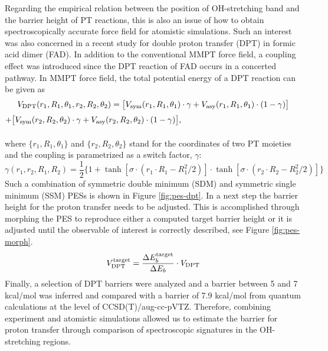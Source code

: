 \documentclass[journal=jacsat,manuscript=article]{achemso}
\begin{document}
\noindent
Regarding the empirical relation between the position of OH-stretching
band and the barrier height of PT reactions, this is also an issue of
how to obtain spectroscopically accurate force field for atomistic
simulations. Such an interest was also concerned in a recent study for
double proton transfer (DPT) in formic acid dimer
(FAD)\cite{mackeprangmeuwly.pccp.2016.mmpt}. In addition to the
conventional MMPT force field, a coupling effect was introduced since
the DPT reaction of FAD occurs in a concerted pathway.  In MMPT force
field, the total potential energy of a DPT reaction can be given as
\begin{equation}
V_{\rm DPT} (r_1,R_1,\theta_1,r_2,R_2,\theta_2)=\big[V_{\rm 
sym}(r_1,R_1,\theta_1)\cdot\gamma+V_{\rm asy}(r_1,R_1,\theta_1)\cdot(1-\gamma)\big]
\label{eq:edpt}
\end{equation}
{\centering$ +\big[V_{\rm sym}(r_2,R_2,\theta_2)\cdot\gamma+V_{\rm asy}(r_2,R_2,\theta_2)\cdot(1-\gamma)\big], $}
\\
\\
\noindent
where $ \{r_1,R_1,\theta_1\} $ and $ \{r_2,R_2,\theta_2\} $ stand for
the coordinates of two PT moieties and the coupling is parametrized as
a switch factor, $\gamma$:
\begin{equation}
\gamma(r_1,r_2,R_1,R_2)=\frac{1}{2}\big\{1+\tanh[\sigma\cdot(r_1\cdot
  R_1-R_1^2/2)]\cdot\tanh[\sigma\cdot(r_2\cdot R_2-R_2^2/2)]\big\}
\label{eq:gamma}
\end{equation}
\noindent
Such a combination of symmetric double minimum (SDM) and symmetric
single minimum (SSM) PESs is shown in Figure \ref{fig:pes-dpt}. In a
next step the barrier height for the proton transfer needs to be
adjusted. This is accomplished through morphing the PES to reproduce
either a computed target barrier height or it is adjusted until the
observable of interest is correctly described, see Figure
\ref{fig:pes-morph}.
\begin{equation}
V_{\rm DPT}^{\rm target}=\frac{\Delta E_b^{\rm target}}{\Delta E_b}\cdot V_{\rm DPT}
\label{eq:morph}
\end{equation}
Finally, a selection of DPT barriers were analyzed and a barrier
between 5 and 7 kcal/mol was inferred and compared with a barrier of
7.9 kcal/mol from quantum calculations at the level of
CCSD(T)/aug-cc-pVTZ.  Therefore, combining experiment and atomistic
simulations allowed us to estimate the barrier for proton transfer
through comparison of spectroscopic signatures in the OH-stretching
regions.
\end{document}
